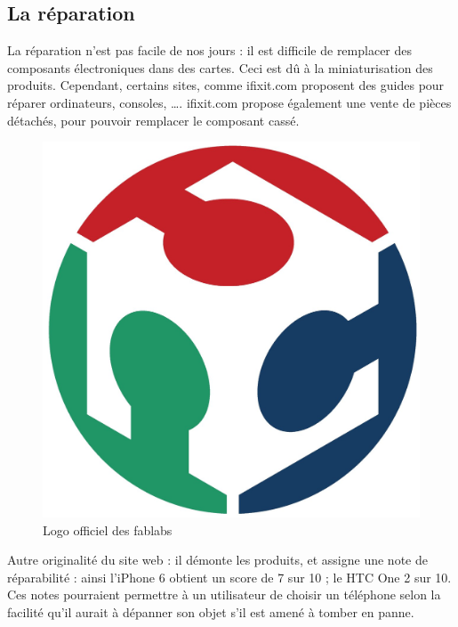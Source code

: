 \subsection{La réparation}
\label{ss::repartation}


La réparation n'est pas facile de nos jours : il est difficile de remplacer des composants électroniques dans des cartes. Ceci est dû à la miniaturisation des produits. Cependant, certains sites, comme ifixit.com proposent des guides pour réparer ordinateurs, consoles, \dots. ifixit.com propose également une vente de pièces détachés, pour pouvoir remplacer le composant cassé. 

\begin{figure}\begin{center}
\vspace{-0.5cm}\includegraphics[scale=0.25]{Rsc/logofablab.jpg} 

\caption{Logo officiel des fablabs}
\end{center}
\end{figure}

Autre originalité du site web : il démonte les produits, et assigne une note de réparabilité : ainsi l'iPhone 6 obtient un score de 7 sur 10 ; le HTC One 2 sur 10.  Ces notes pourraient permettre à un utilisateur de choisir un téléphone selon la facilité qu'il aurait à dépanner son objet s'il est amené à tomber en panne. 
\medbreak

